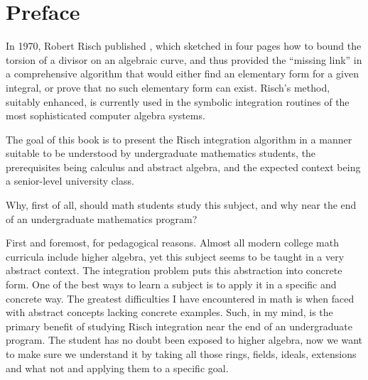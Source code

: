
\chapter*{Preface}

\begin{comment}
This book grew out of an abortive class in Risch Integration that I
taught at University of Maryland at College Park in the spring of
2006,\footnote{I am not a professor at UMCP, and am not affiliated
with the University of Maryland in any way other than having studied
physics there as an undergraduate and being a member of the University
Alumni Association.}  which I canceled after three weeks when I
had no students left.  Aside from the lack of student interest (it was
a non-credit class), another deficiency in the class became apparent
to me --- the lack of a good textbook.  So I am writing this book to
fill this perceived gap, the need for a senior level undergraduate
text on differential algebra, developing the subject so far as the
solution of the problem of integration in finite terms (the
integration problem), the theory's most famous application to date.
\end{comment}

In 1970, Robert Risch published \cite{risch}, which sketched in four
pages how to bound the torsion of a divisor on an algebraic curve, and
thus provided the ``missing link'' in a comprehensive algorithm that
would either find an elementary form for a given integral, or prove
that no such elementary form can exist.  Risch's method, suitably
enhanced, is currently used in the symbolic integration routines of
the most sophisticated computer algebra systems.

The goal of this book is to present the Risch integration algorithm in a manner
suitable to be understood by undergraduate mathematics students, the
prerequisites being calculus and abstract algebra, and the expected
context being a senior-level university class.

Why, first of all, should math students study this subject, and why
near the end of an undergraduate mathematics program?

First and foremost, for pedagogical reasons.  Almost all modern
college math curricula include higher algebra, yet this subject seems
to be taught in a very abstract context.  The integration problem puts
this abstraction into concrete form.
One of the best ways to learn a subject
is to apply it in a specific and concrete way.  The greatest
difficulties I have encountered in math is when faced with abstract
concepts lacking concrete examples.  Such, in my mind, is the primary
benefit of studying Risch integration near the end of an undergraduate
program.  The student has no doubt been exposed to higher algebra, now
we want to make sure we understand it by taking all those rings,
fields, ideals, extensions and what not and applying them to a
specific goal.

